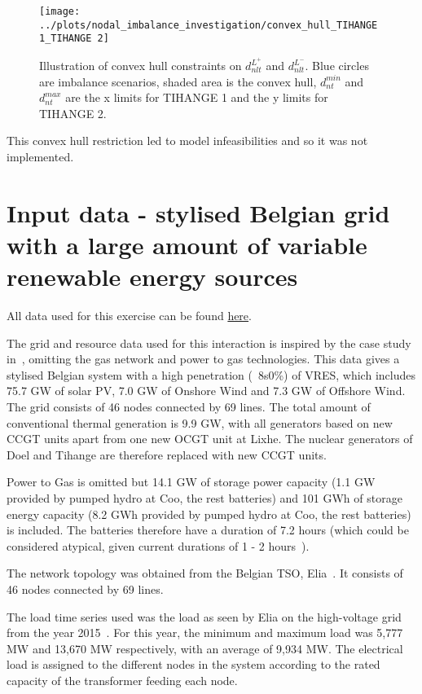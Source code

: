 \documentclass[number,times]{elsarticle}
\begin{document}
\begin{figure}[ht]
    \centering
    \texttt{[image: ../plots/nodal\_imbalance\_investigation/convex\_hull\_TIHANGE 1\_TIHANGE 2]}
    \caption{Illustration of convex hull constraints on $d_{nlt}^{L^+}$ and $d_{nlt}^{L^-}$. Blue circles are imbalance scenarios, shaded area is the convex hull, $d_{nt}^{min}$ and $d_{nt}^{max}$ are the x limits for TIHANGE 1 and the y limits for TIHANGE 2. \label{fig:convex_hull_tihange}}
\end{figure}

This convex hull restriction led to model infeasibilities and so it was not implemented.

\section{Input data - stylised Belgian grid with a large amount of variable renewable energy sources} \label{sec:data}

All data used for this exercise can be found \href{https://www.dropbox.com/sh/mdvmc082gwng0tr/AABRyc3fZpxAFycmUfZmh8Csa?dl=0}{here}.

The grid and resource data used for this interaction is inspired by the case study in~\cite{Belderbos2020}, omitting the gas network and power to gas technologies. This data gives a stylised Belgian system with a high penetration (~8s0\%) of \ac{VRES}, which includes 75.7 GW of solar PV, 7.0 GW of Onshore Wind and 7.3 GW of Offshore Wind. The grid consists of 46 nodes connected by 69 lines. The total amount of conventional thermal generation is 9.9 GW, with all generators based on new \ac{CCGT} units apart from one new \ac{OCGT} unit at Lixhe. The nuclear generators of Doel and Tihange are therefore replaced with new \ac{CCGT} units.

Power to Gas is omitted but 14.1 GW of storage power capacity (1.1 GW provided by pumped hydro at Coo, the rest batteries) and 101 GWh of storage energy capacity (8.2 GWh provided by pumped hydro at Coo, the rest batteries) is included. The batteries therefore have a duration of 7.2 hours (which could be considered atypical, given current durations of 1 - 2 hours~\cite{MITEI2022}).

The network topology was obtained from the Belgian TSO, Elia~\cite{Elia2018grid}. It consists of 46 nodes connected by 69 lines.

The load time series used was the load as seen by Elia on the high-voltage grid from the year 2015~\cite{Belderbos2020}. For this year, the minimum and maximum load was 5,777 MW and 13,670 MW respectively, with an average of 9,934 MW. The electrical load is assigned to the different nodes in the system according to the rated capacity of the transformer feeding each node.
\end{document}
